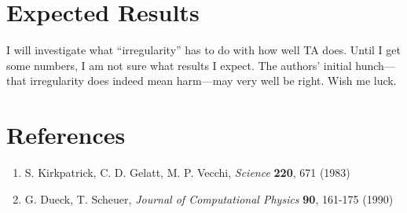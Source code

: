 \documentclass{article}
\begin{document}
\section{Expected Results}

I will investigate what ``irregularity'' has to do with how well TA does. Until I get some numbers, I am not sure what results I expect. The authors' initial hunch---that irregularity does indeed mean harm---may very well be right. Wish me luck.

\section*{References}

\begin{enumerate}
\item S. Kirkpatrick, C. D. Gelatt, M. P. Vecchi, \textit{Science} \textbf{220}, 671 (1983)
\item G. Dueck, T. Scheuer, \textit{Journal of Computational Physics} \textbf{90}, 161-175 (1990)
\end{enumerate}
\end{document}
